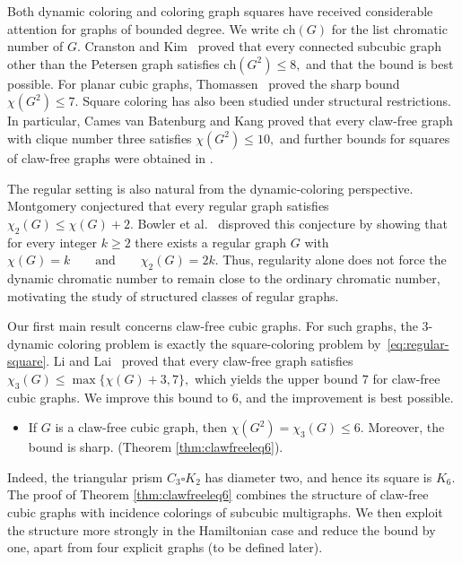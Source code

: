 \documentclass[10pt,a4paper]{article}
\newtheorem{theorem}             {Theorem}
\theoremstyle{case}
\numberwithin{subcase}{case}
\begin{document}
Both dynamic coloring and coloring graph squares have received
considerable attention for graphs of bounded degree. We write
$\text{ch}(G)$ for the list chromatic number of $G$.
Cranston and Kim~\cite{CranstonKim2008} proved that every connected
subcubic graph other than the Petersen graph satisfies
$
\text{ch}(G^2)\le8,
$
and that the bound is best possible. For planar cubic graphs,
Thomassen~\cite{Thomassen2018} proved the sharp bound
$
\chi(G^2)\le7.
$
Square coloring has also been studied under structural restrictions.
In particular, Cames van Batenburg and Kang
\cite{CamesVanBatenburgKang2019} proved that every claw-free graph
with clique number three satisfies
$
\chi(G^2)\le10,
$
and further bounds for squares of claw-free graphs were obtained in
\cite{DeJoannisKangPastor2019}.

The regular setting is also natural from the dynamic-coloring
perspective. Montgomery conjectured that every regular graph satisfies
$
\chi_2(G)\le\chi(G)+2.
$
Bowler et al.~\cite{BowlerEtAl2017} disproved this conjecture by showing
that for every integer $k\ge2$ there exists a regular graph $G$ with
$
\chi(G)=k
\qquad\text{and}\qquad
\chi_2(G)=2k.
$
Thus, regularity alone does not force the dynamic chromatic number to
remain close to the ordinary chromatic number, motivating the study of
structured classes of regular graphs.

Our first main result concerns claw-free cubic graphs. For such graphs,
the $3$-dynamic coloring problem is exactly the square-coloring problem
by~\eqref{eq:regular-square}. Li and Lai~\cite{LiLai2017} proved that
every claw-free graph satisfies
$
\chi_3(G)\le \max\{\chi(G)+3,7\},
$
which yields the upper bound $7$ for claw-free cubic graphs. We improve
this bound to $6$, and the improvement is best possible.

\begin{itemize}
    \item 
If $G$ is a claw-free cubic graph, then
$
\chi(G^2)=\chi_3(G)\le6.
$
Moreover, the bound is sharp. (Theorem \ref{thm:clawfreeleq6}).
\end{itemize}

Indeed, the triangular prism $C_3\square K_2$ has diameter two, and
hence its square is $K_6$.
The proof of Theorem \ref{thm:clawfreeleq6} combines the structure of claw-free cubic
graphs with incidence colorings of subcubic multigraphs. We then exploit
the structure more strongly in the Hamiltonian case and reduce the
bound by one, apart from four explicit graphs (to be defined later).
\end{document}
